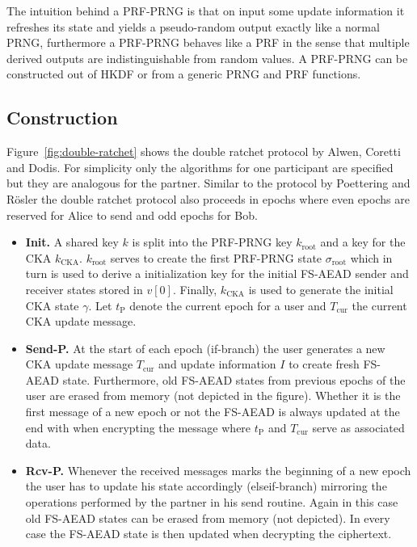 \documentclass[11pt,a4paper,twoside,openright,bibliography=totoc]{scrbook}
\renewcommand{\t}{\text} %
\begin{document}
The intuition behind a PRF-PRNG is that on input some update information
it refreshes its state and yields a pseudo-random output exactly like
a normal PRNG, furthermore a PRF-PRNG behaves like a PRF in the sense
that multiple derived outputs are indistinguishable from random
values. A PRF-PRNG can be constructed out of HKDF or from
a generic PRNG and PRF functions.

\subsection{Construction}
\label{sec:construction-4}

Figure~\ref{fig:double-ratchet} shows the double ratchet protocol by
Alwen, Coretti and Dodis. For simplicity only the algorithms
for one participant are specified but they are analogous for
the partner. Similar to the protocol by Poettering and Rösler
the double ratchet protocol also proceeds in epochs where
even epochs are reserved for Alice to send and odd epochs for Bob.
\begin{itemize}
\item \textbf{Init.} A shared key $k$ is split into the PRF-PRNG key
  $k_\t{root}$ and a key for the CKA $k_\t{CKA}$. $k_\t{root}$ serves
  to create the first PRF-PRNG state $\sigma_\t{root}$ which in
  turn is used to derive a initialization key for the initial
  FS-AEAD sender and receiver states stored in $v[0]$. Finally,
  $k_\t{CKA}$ is used to generate the initial CKA state $\gamma$. Let
  $t_\t{P}$ denote the current epoch for a user and $T_\t{cur}$ the
  current CKA update message.
\item \textbf{Send-P.} At the start of each epoch (if-branch) the user
  generates a new CKA update message $T_\t{cur}$ and update information $I$
  to create fresh FS-AEAD state. Furthermore, old FS-AEAD states from previous
  epochs of the user are erased from memory (not depicted in the figure).
  Whether it is the first message of a new epoch or not the FS-AEAD is
  always updated at the end with when encrypting
  the message where $t_\t{P}$ and $T_\t{cur}$ serve as associated data.
\item \textbf{Rcv-P.} Whenever the received messages marks the beginning
  of a new epoch the user has to update his state accordingly (elseif-branch)
  mirroring the operations performed by the partner in his send
  routine. Again in this case old FS-AEAD states can be erased
  from memory (not depicted). In every case the FS-AEAD state
  is then updated when decrypting the ciphertext.
  
\end{itemize}
\end{document}

